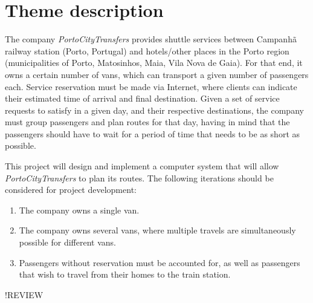 \chapter{Theme description} \label{theme-description}
The company \emph{PortoCityTransfers} provides shuttle services between Campanhã railway station (Porto, Portugal) and hotels/other places in the Porto region (municipalities of Porto, Matosinhos, Maia, Vila Nova de Gaia). For that end, it owns a certain number of vans, which can transport a given number of passengers each. Service reservation must be made via Internet, where clients can indicate their estimated time of arrival and final destination. Given a set of service requests to satisfy in a given day, and their respective destinations, the company must group passengers and plan routes for that day, having in mind that the passengers should have to wait for a period of time that needs to be as short as possible.\par
This project will design and implement a computer system that will allow \emph{PortoCityTransfers} to plan its routes. The following iterations should be considered for project development:
\begin{enumerate}
    \item The company owns a single van.
    \item The company owns several vans, where multiple travels are simultaneously possible for different vans.
    \item Passengers without reservation must be accounted for, as well as passengers that wish to travel from their homes to the train station.
\end{enumerate}
!REVIEW
